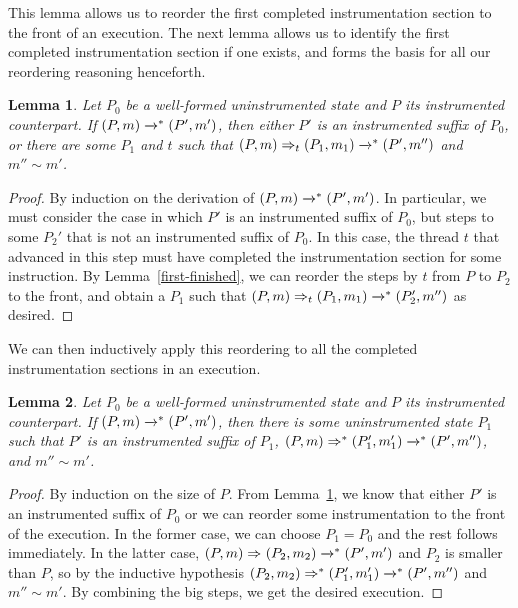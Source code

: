 \documentclass[preprint, 10pt]{sigplanconf}
\newcommand{\cfg}[2]{\ensuremath{(#1, #2)}}
\newcommand{\execstar}[4]{\ensuremath{\cfg{#1}{#2} \tto{#3} #4}}
\newcommand{\iexec}[4]{\ensuremath{\cfg{#1}{#2} \Rightarrow_{#3} #4}}
\newcommand{\execstars}[2]{\ensuremath{ \tto{#1} #2}}
\newcommand{\iexecstar}[3]{\ensuremath{(#1, #2) \Rightarrow^{*} #3}}
\newcommand{\tto}[1]{\mathrel{
  \vphantom{\xrightarrow{#1}}
  \smash{\xrightarrow{#1}}
  \vphantom{\to}^{*}}
}
\newtheorem{lemma}{Lemma}
\begin{document}
This lemma allows us to reorder the first completed instrumentation section to the front of an execution. The next lemma allows us to identify the first completed instrumentation section if one exists, and forms the basis for all our reordering reasoning henceforth.
\begin{lemma}\label{next-iexec}Let $P_0$ be a well-formed uninstrumented state and $P$ its instrumented counterpart. If $\execstar{P}{m}{}{(P', m')}$, then either $P'$ is an instrumented suffix of $P_0$, or there are some $P_1$ and $t$ such that $\iexec{P}{m}{t}{(P_1, m_1)} \execstars{}{(P', m'')}$ and $m'' \sim m'$.\end{lemma}
\begin{proof}By induction on the derivation of $\execstar{P}{m}{}{(P', m')}$. In particular, we must consider the case in which $P'$ is an instrumented suffix of $P_0$, but steps to some $P_2'$ that is not an instrumented suffix of $P_0$. In this case, the thread $t$ that advanced in this step must have completed the instrumentation section for some instruction. By Lemma~\ref{first-finished}, we can reorder the steps by $t$ from $P$ to $P_2$ to the front, and obtain a $P_1$ such that $\iexec{P}{m}{t}{(P_1, m_1)} \execstars{}{(P_2', m'')}$ as desired.\end{proof}

We can then inductively apply this reordering to all the completed instrumentation sections in an execution.
\begin{lemma}\label{exec-iexec1}Let $P_0$ be a well-formed uninstrumented state and $P$ its instrumented counterpart. If $\execstar{P}{m}{}{(P', m')}$, then there is some uninstrumented state $P_1$ such that $P'$ is an instrumented suffix of $P_1$, $\iexecstar{P}{m}{(P_1', m_1')} \execstars{}{(P', m'')}$, and $m'' \sim m'$.\end{lemma}
\begin{proof}By induction on the size of $P$. From Lemma~\ref{next-iexec}, we know that either $P'$ is an instrumented suffix of $P_0$ or we can reorder some instrumentation to the front of the execution. In the former case, we can choose $P_1 = P_0$ and the rest follows immediately. In the latter case, $\iexec{P}{m}{}{(P_2, m_2)} \execstars{}{(P', m')}$ and $P_2$ is smaller than $P$, so by the inductive hypothesis $\iexecstar{P_2}{m_2}{(P_1', m_1')} \execstars{}{(P', m'')}$ and $m'' \sim m'$. By combining the big steps, we get the desired execution.\end{proof}
\end{document}
